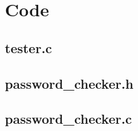 \documentclass[12pt,letterpaper]{article}
\begin{document}
\section{Code}

\subsection{tester.c}



\subsection{password\_checker.h}



\subsection{password\_checker.c}


\end{document}

